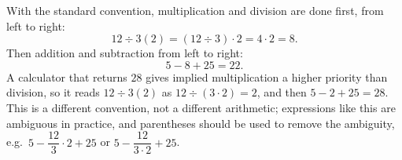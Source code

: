 With the standard convention, multiplication and division are done first, from left to right:
\[
12\div3(2)=(12\div3)\cdot2=4\cdot2=8 .
\]
Then addition and subtraction from left to right:
\[
5-8+25=\boxed{22}.
\]
A calculator that returns $28$ gives implied multiplication a higher priority than division, so it reads $12\div3(2)$ as $12\div(3\cdot2)=2$, and then $5-2+25=28$. This is a different convention, not a different arithmetic; expressions like this are ambiguous in practice, and parentheses should be used to remove the ambiguity, e.g.\ $5-\dfrac{12}{3}\cdot2+25$ or $5-\dfrac{12}{3\cdot2}+25$.
